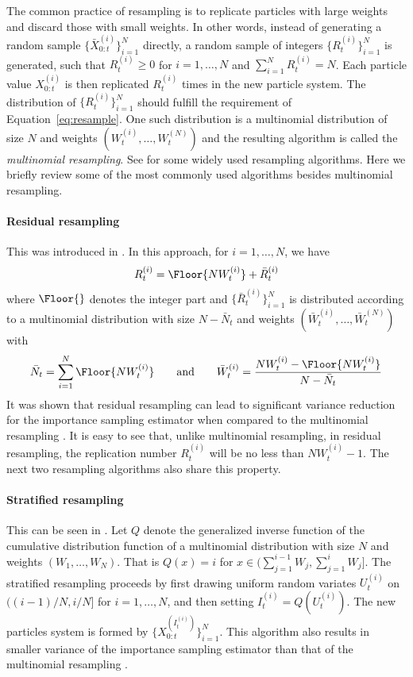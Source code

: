 The common practice of resampling is to replicate particles with large weights and discard those with small weights. In other words, instead of generating a random sample $\{\bar{X}_{0:t}^{(i)}\}_{i=1}^N$ directly, a random sample of integers $\{R_t^{(i)}\}_{i=1}^N$ is generated, such that $R_t^{(i)} \ge 0$ for $i = 1,\dots,N$ and $\sum_{i=1}^N R_t^{(i)} = N$. Each particle value $X_{0:t}^{(i)}$ is then replicated $R_t^{(i)}$ times in the new particle system. The distribution of $\{R_t^{(i)}\}_{i=1}^N$ should fulfill the requirement of Equation~\eqref{eq:resample}. One such distribution is a multinomial distribution of size $N$ and weights $(W_t^{(i)},\dots,W_t^{(N)})$ and the resulting algorithm is called the \emph{multinomial resampling}. See \cite{Douc:2005wa} for some widely used resampling algorithms. Here we briefly review some of the most commonly used algorithms besides multinomial resampling.

\paragraph{Residual resampling}

This was introduced in \cite{Liu:1998iu}. In this approach, for $i = 1,\dots,N$, we have
\begin{equation}
  R_t^{(i)} = \Floor{NW_t^{(i)}} + \bar{R}_t^{(i)}
\end{equation}
where $\Floor{}$ denotes the integer part and $\{\bar{R}_t^{(i)}\}_{i=1}^N$ is distributed according to a multinomial distribution with size $N - \bar{N}_t$ and weights $(\bar{W}_t^{(i)},\dots,\bar{W}_t^{(N)})$ with
\begin{equation*}
  \bar{N}_t = \sum_{i=1}^N\Floor{NW_t^{(i)}} \qquad\text{and}\qquad
  \bar{W}_t^{(i)} = \frac{NW_t^{(i)} - \Floor{NW_t^{(i)}}}{N - \bar{N}_t}
\end{equation*}
It was shown that residual resampling can lead to significant variance reduction for the importance sampling estimator when compared to the multinomial resampling \cite{Douc:2005wa}. It is easy to see that, unlike multinomial resampling, in residual resampling, the replication number $R_t^{(i)}$ will be no less than $NW_t^{(i)} - 1$. The next two resampling algorithms also share this property.

\paragraph{Stratified resampling}

This can be seen in \cite{Kitagawa:1996vx}. Let $Q$ denote the generalized inverse function of the cumulative distribution function of a multinomial distribution with size $N$ and weights $(W_1,\dots,W_N)$. That is $Q(x) = i$ for $x\in(\sum_{j=1}^{i-1}W_j,\sum_{j=1}^iW_j]$. The stratified resampling proceeds by first drawing uniform random variates $U_t^{(i)}$ on $((i-1)/N, i/N]$ for $i = 1,\dots,N$, and then setting $I_t^{(i)} = Q(U_t^{(i)})$. The new particles system is formed by $\{X_{0:t}^{(I_t^{(i)})}\}_{i=1}^N$. This algorithm also results in smaller variance of the importance sampling estimator than that of the multinomial resampling \cite{Douc:2005wa}.

